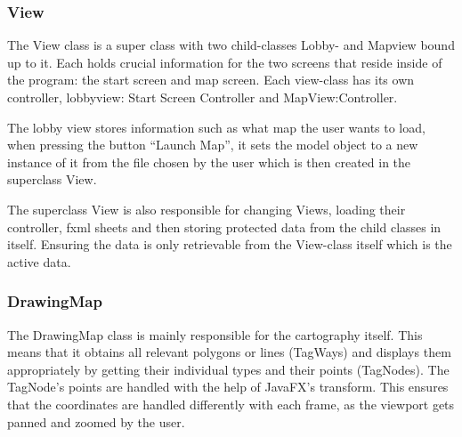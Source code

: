 \subsubsection{View}

The View class is a super class with two child-classes Lobby- and Mapview bound up to it. Each holds crucial information for the two screens that reside inside of the program: the start screen and map screen. Each view-class has its own controller, lobbyview: Start Screen Controller and MapView:Controller. 

The lobby view stores information such as what map the user wants to load, when pressing the button “Launch Map”, it sets the model object to a new instance of it from the file chosen by the user which is then created in the superclass View. 

The superclass View is also responsible for changing Views, loading their controller, fxml sheets and then storing protected data from the child classes in itself. Ensuring the data is only retrievable from the View-class itself which is the active data.

 \subsubsection{DrawingMap}
 The DrawingMap class is mainly responsible for the cartography itself. This means that it obtains all relevant polygons or lines (TagWays) and displays them appropriately by getting their individual types and their points (TagNodes).
The TagNode’s points are handled with the help of JavaFX’s transform. This ensures that the coordinates are handled differently with each frame, as the viewport gets panned and zoomed by the user.